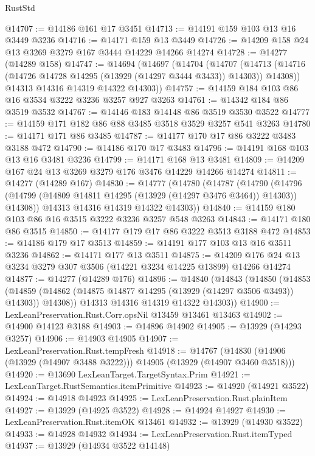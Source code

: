 \begin{lexlean}{RustStd}
\begin{coremodule}
@14707 := @14186 @161 @17 @3451
@14713 := @14191 @159 @103 @13 @16 @3449 @3236
@14716 := @14171 @159 @13 @3449
@14726 := @14209 @158 @24 @13 @3269 @3279 @167 @3444 @14229 @14266 @14274
@14728 := @14277 (@14289 @158)
@14747 := @14694
    (@14697
      (@14704
        (@14707
          (@14713 (@14716 (@14726 @14728 @14295 (@13929 (@14297 @3444 @3433)) @14303)) @14308))
        @14313
        @14316
        @14319
        @14322
        @14303))
@14757 := @14159 @184 @103 @86 @16 @3534 @3222 @3236 @3257 @927 @3263
@14761 := @14342 @184 @86 @3519 @3532
@14767 := @14146 @183 @14148 @86 @3519 @3530 @3522
@14777 := @14159 @171 @182 @86 @88 @3485 @3518 @3529 @3257 @541 @3263
@14780 := @14171 @171 @86 @3485
@14787 := @14177 @170 @17 @86 @3222 @3483 @3188 @472
@14790 := @14186 @170 @17 @3483
@14796 := @14191 @168 @103 @13 @16 @3481 @3236
@14799 := @14171 @168 @13 @3481
@14809 := @14209 @167 @24 @13 @3269 @3279 @176 @3476 @14229 @14266 @14274
@14811 := @14277 (@14289 @167)
@14830 := @14777
    (@14780
      (@14787
        (@14790
          (@14796 (@14799 (@14809 @14811 @14295 (@13929 (@14297 @3476 @3464)) @14303)) @14308))
        @14313
        @14316
        @14319
        @14322
        @14303))
@14840 := @14159 @180 @103 @86 @16 @3515 @3222 @3236 @3257 @548 @3263
@14843 := @14171 @180 @86 @3515
@14850 := @14177 @179 @17 @86 @3222 @3513 @3188 @472
@14853 := @14186 @179 @17 @3513
@14859 := @14191 @177 @103 @13 @16 @3511 @3236
@14862 := @14171 @177 @13 @3511
@14875 := @14209 @176 @24 @13 @3234 @3279 @307 @3506 (@14221 @3234 @14225 @13899) @14266 @14274
@14877 := @14277 (@14289 @176)
@14896 := @14840
    (@14843
      (@14850
        (@14853
          (@14859 (@14862 (@14875 @14877 @14295 (@13929 (@14297 @3506 @3493)) @14303)) @14308))
        @14313
        @14316
        @14319
        @14322
        @14303))
@14900 := LexLeanPreservation.Rust.Corr.opsNil @13459 @13461 @13463
@14902 := @14900 @14123 @3188
@14903 := @14896 @14902
@14905 := @13929 (@14293 @3257)
@14906 := @14903 @14905
@14907 := LexLeanPreservation.Rust.tempFresh
@14918 := @14767
    (@14830 (@14906 (@13929 (@14907 @3488 @3222))) @14905 (@13929 (@14907 @3460 @3518)))
@14920 := @13690 LexLeanTarget.TargetSyntax.Prim
@14921 := LexLeanTarget.RustSemantics.itemPrimitive
@14923 := @14920 (@14921 @3522)
@14924 := @14918 @14923
@14925 := LexLeanPreservation.Rust.plainItem
@14927 := @13929 (@14925 @3522)
@14928 := @14924 @14927
@14930 := LexLeanPreservation.Rust.itemOK @13461
@14932 := @13929 (@14930 @3522)
@14933 := @14928 @14932
@14934 := LexLeanPreservation.Rust.itemTyped
@14937 := @13929 (@14934 @3522 @14148)

\end{coremodule}
\end{lexlean}
